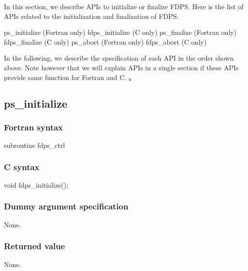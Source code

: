 In this section, we describe APIs to initialize or finalize FDPS.
Here is the list of APIs related to the initialization and finalization of FDPS:
\begin{screen}
\begin{spverbatim}
ps_initialize (Fortran only)
fdps_initialize (C only)
ps_finalize (Fortran only)
fdps_finalize (C only)
ps_abort (Fortran only)
fdps_abort (C only)
\end{spverbatim}
\end{screen}

In the following, we describe the specification of each API in the order shown above. Note however that we will explain APIs in a single section if these APIs provide same function for Fortran and C. {\setnoko{}}。

\clearpage


\subsection{ps\_initialize}
\subsubsection*{Fortran syntax}
\begin{screen}
\begin{spverbatim}
subroutine fdps_ctrl%
\end{spverbatim}
\end{screen}

\subsubsection*{C syntax}
\begin{screen}
\begin{spverbatim}
void fdps_initialize();
\end{spverbatim}
\end{screen}


\subsubsection*{Dummy argument specification} 
None.

\subsubsection*{Returned value}
None.

